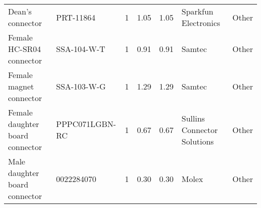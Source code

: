 \documentclass[11pt,letterpaper]{article}
\begin{document}
\begin{longtable}{ p{1.75cm} p{4cm} p{1.25cm} p{1cm} p{1cm} p{2cm} p{2.5cm} }
	\rowcolor[gray]{0.925}
	Dean's connector & PRT-11864  & 1 & 1.05 & 1.05 & Sparkfun Electronics & Other \\
	
	
	Female HC-SR04 connector & SSA-104-W-T & 1 & 0.91 & 0.91 & Samtec & Other \\ 
	
	\rowcolor[gray]{0.925}
	Female magnet connector & SSA-103-W-G & 1 & 1.29 & 1.29 & Samtec & Other \\ 
	
	
	Female daughter board connector & PPPC071LGBN-RC & 1 & 0.67 & 0.67 & Sullins Connector Solutions & Other \\

	\rowcolor[gray]{0.925}
	Male daughter board connector & 0022284070 & 1 & 0.30 & 0.30 & Molex & Other \\ 
	
	\bottomrule
\end{longtable}

\pagebreak

	
\end{document}
